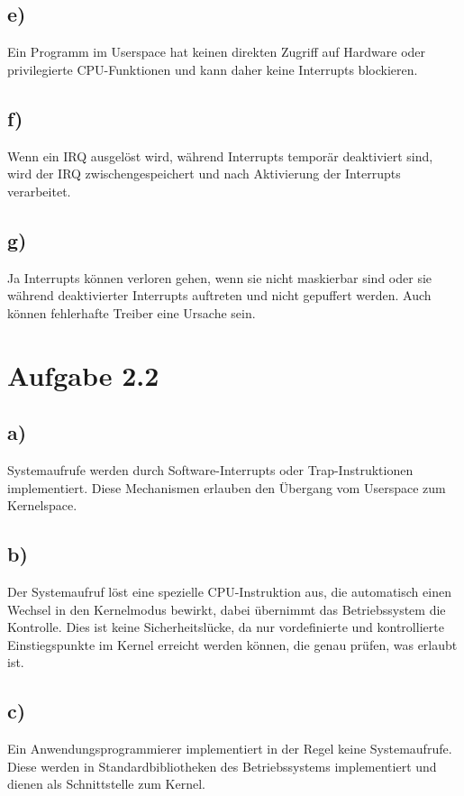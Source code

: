 \documentclass[a4paper,12pt]{article}
\begin{document}
\subsection*{e)}
Ein Programm im Userspace hat keinen direkten Zugriff auf Hardware oder privilegierte CPU-Funktionen
und kann daher keine Interrupts blockieren.

\subsection*{f)}
Wenn ein IRQ ausgelöst wird, während Interrupts temporär deaktiviert sind, wird der IRQ zwischengespeichert und nach Aktivierung der
Interrupts verarbeitet.

\subsection*{g)}
Ja Interrupts können verloren gehen, wenn sie nicht maskierbar sind oder sie während deaktivierter Interrupts auftreten und nicht
gepuffert werden. Auch können fehlerhafte Treiber eine Ursache sein.

\section*{Aufgabe 2.2}
\subsection*{a)}
Systemaufrufe werden durch Software-Interrupts oder Trap-Instruktionen implementiert. Diese Mechanismen erlauben den Übergang vom Userspace
zum Kernelspace.

\subsection*{b)}
Der Systemaufruf löst eine spezielle CPU-Instruktion aus, die automatisch einen Wechsel in den Kernelmodus bewirkt, 
dabei übernimmt das Betriebssystem die Kontrolle. 
Dies ist keine Sicherheitslücke, da nur vordefinierte und kontrollierte Einstiegspunkte im Kernel erreicht werden können, 
die genau prüfen, was erlaubt ist.

\subsection*{c)}
Ein Anwendungsprogrammierer implementiert in der Regel keine Systemaufrufe. Diese werden in Standardbibliotheken des Betriebssystems
implementiert und dienen als Schnittstelle zum Kernel.
\end{document}
